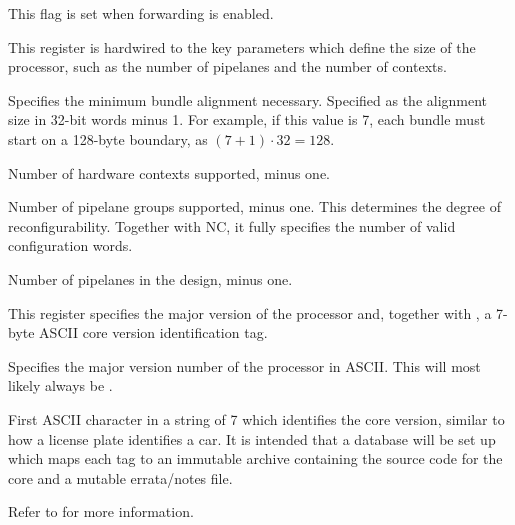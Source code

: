 \reset{*}
This flag is set when forwarding is enabled.


This register is hardwired to the key parameters which define the size of the
processor, such as the number of pipelanes and the number of contexts.

\reset{****}
Specifies the minimum bundle alignment necessary. Specified as the alignment
size in 32-bit words minus 1. For example, if this value is 7, each bundle must
start on a 128-byte boundary, as $(7 + 1) \cdot 32 = 128$.

\reset{****}
Number of hardware contexts supported, minus one.

\reset{****}
Number of pipelane groups supported, minus one. This determines the degree of
reconfigurability. Together with NC, it fully specifies the number of valid
configuration words.

\reset{****}
Number of pipelanes in the design, minus one.


This register specifies the major version of the processor and, together with
, a 7-byte ASCII core version identification tag.

Specifies the major version number of the \rvex{} processor in ASCII. This will
most likely always be .

First ASCII character in a string of 7 which identifies the core version,
similar to how a license plate identifies a car. It is intended that a database
will be set up which maps each tag to an immutable archive containing the source
code for the core and a mutable errata/notes file.



Refer to  for more information.

